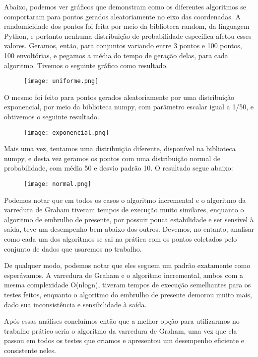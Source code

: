 \documentclass{article}
\begin{document}
Abaixo, podemos ver gráficos que demonstram como os diferentes algoritmos se comportaram para pontos gerados aleatoriamente no eixo das coordenadas. A randomicidade dos pontos foi feita por meio da biblioteca random, da linguagem Python, e portanto nenhuma distribuição de probabilidade específica afetou esses valores. Geramos, então, para conjuntos variando entre 3 pontos e 100 pontos, 100 envoltórias, e pegamos a média do tempo de geração delas, para cada algoritmo. Tivemos o seguinte gráfico como resultado.

\begin{figure} [H]
    \texttt{[image: uniforme.png]} 
    \centering
\end{figure}

O mesmo foi feito para pontos gerados aleatoriamente por uma distribuição exponencial, por meio da biblioteca numpy, com parâmetro escalar igual a 1/50, e obtivemos o seguinte resultado.

\begin{figure} [H]
    \texttt{[image: exponencial.png]} 
    \centering
\end{figure}

Mais uma vez, tentamos uma distribuição diferente, disponível na biblioteca numpy, e desta vez geramos os pontos com uma distribuição normal de probabilidade, com média 50 e desvio padrão 10. O resultado segue abaixo:

\begin{figure} [H]
    \texttt{[image: normal.png]} 
    \centering
\end{figure}

Podemos notar que em todos os casos o algoritmo incremental e o algoritmo da varredura de Graham tiveram tempos de execução muito similares, enquanto o algoritmo de embrulho de presente, por possuir pouca estabilidade e ser sensível à saída, teve um desempenho bem abaixo dos outros. Devemos, no entanto, analisar como cada um dos algoritmos se sai na prática com os pontos coletados pelo conjunto de dados que usaremos no trabalho.

De qualquer modo, podemos notar que eles seguem um padrão exatamente como esperávamos. A varredura de Graham e o algoritmo incremental, ambos com a mesma complexidade O(nlogn), tiveram tempos de execução semelhantes para os testes feitos, enquanto o algoritmo do embrulho de presente demorou muito mais, dado sua inconsistência e sensibilidade à saída.

Após essas análises concluímos então que a melhor opção para utilizarmos no trabalho prático seria o algoritmo da varredura de Graham, uma vez que ela passou em todos os testes que criamos e apresentou um desempenho eficiente e consistente neles.
\end{document}
